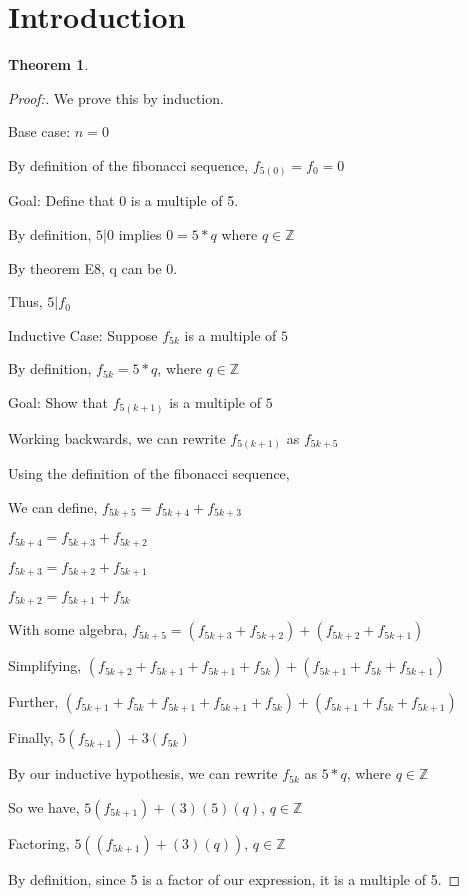 \documentclass[12pt]{article}
\newtheorem{theorem}{Theorem}[section]
\begin{document}
\section{Introduction}
\begin{theorem}
\end{theorem}

\begin{proof}[Proof:]
    We prove this by induction.

    Base case: $n = 0$

    By definition of the fibonacci sequence, $f_{5(0)} = f_0 = 0$

    Goal: Define that 0 is a multiple of 5.

    By definition, $5 | 0$ implies $0 = 5 * q$ where $q \in \mathbb{Z}$

    By theorem E8, q can be 0.

    Thus, $5 | f_{0}$

    \medbreak

    Inductive Case: Suppose $f_{5k}$ is a multiple of $5$

    By definition, $f_{5k} = 5 * q$, where $q \in \mathbb{Z}$

    Goal: Show that $f_{5(k+1)}$ is a multiple of $5$

    Working backwards, we can rewrite $f_{5(k+1)}$ as $f_{5k+5}$

    Using the definition of the fibonacci sequence,

    We can define, $f_{5k+5} = f_{5k+4} + f_{5k+3}$

    $f_{5k+4} = f_{5k+3} + f_{5k+2}$

    $f_{5k+3} = f_{5k+2} + f_{5k+1}$

    $f_{5k+2} = f_{5k+1} + f_{5k}$

    With some algebra, $f_{5k+5} = (f_{5k+3} + f_{5k+2}) + (f_{5k+2} + f_{5k+1})$

    Simplifying, $(f_{5k+2} + f_{5k+1} + f_{5k+1} + f_{5k}) + (f_{5k+1} + f_{5k} + f_{5k+1})$

    Further, $(f_{5k+1} + f_{5k} + f_{5k+1} + f_{5k+1} + f_{5k}) + (f_{5k+1} + f_{5k} + f_{5k+1})$

    Finally, $5(f_{5k+1}) + 3(f_{5k})$

    By our inductive hypothesis, we can rewrite $f_{5k}$ as $5 * q$, where $q \in \mathbb{Z}$

    So we have, $5(f_{5k+1}) + (3)(5)(q)$, $q \in \mathbb{Z}$

    Factoring, $5((f_{5k+1}) + (3)(q))$, $q \in \mathbb{Z}$

    By definition, since 5 is a factor of our expression, it is a multiple of 5.

\end{proof}
\end{document}
